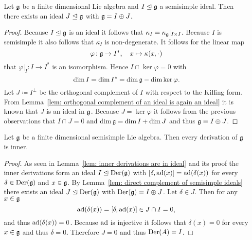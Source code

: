 \begin{lem}\label{lem: direct complement of semisimple ideals}
 Let $\mathfrak{g}$ be a finite dimensional Lie algebra and $I \trianglelefteq \mathfrak{g}$ a semisimple ideal. Then there exists an ideal $J \trianglelefteq \mathfrak{g}$ with $\mathfrak{g} = I \oplus J$.
\end{lem}
\begin{proof}
 Because $I \trianglelefteq \mathfrak{g}$ is an ideal it follows that $\kappa_I = \kappa_{\mathfrak{g}}|_{I \times I}$. Because $I$ is semisimple it also follows that $\kappa_I$ is non-degenerate. It follows for the linear map
 \[
  \varphi \colon \mathfrak{g} \to I^*, \quad x \mapsto \kappa(x, \cdot)
 \]
 that $\varphi|_I \colon I \to I^*$ is an isomorphism. Hence $I \cap \ker \varphi = 0$ with
 \[
  \dim I = \dim I^* = \dim \mathfrak{g} - \dim \ker \varphi.
 \]
 Let $J \coloneqq I^\perp$ be the orthogonal complement of $I$ with respect to the Killing form. From Lemma~\ref{lem: orthogonal complement of an ideal is again an ideal} it is known that $J$ is an ideal in $\mathfrak{g}$. Because $J = \ker \varphi$ it follows from the previous observations that $I \cap J = 0$ and $\dim \mathfrak{g} = \dim I + \dim J$ and thus $\mathfrak{g} = I \oplus J$.
\end{proof}


\begin{lem}\label{lem: every derivation of a semisimple Lie algebra is inner}
 Let $\mathfrak{g}$ be a finite dimensional semisimple Lie algebra. Then every derivation of $\mathfrak{g}$ is inner.
\end{lem}
\begin{proof}
 As seen in Lemma~\ref{lem: inner derivations are in ideal} and its proof the inner derivations form an ideal $I \trianglelefteq \operatorname{Der}(\mathfrak{g})$ with $[\delta,\operatorname{ad}(x)] = \operatorname{ad}(\delta(x))$ for every $\delta \in \operatorname{Der}(\mathfrak{g})$ and $x \in \mathfrak{g}$. By Lemma~\ref{lem: direct complement of semisimple ideals} there exists an ideal $J \trianglelefteq \operatorname{Der}(\mathfrak{g})$ with $\operatorname{Der}(\mathfrak{g}) = I \oplus J$. Let $\delta \in J$. Then for any $x \in \mathfrak{g}$
 \[
  \operatorname{ad}(\delta(x)) = [\delta, \operatorname{ad}(x)] \in J \cap I = 0,
 \]
 and thus $\operatorname{ad}(\delta(x)) = 0$. Because $\operatorname{ad}$ is injective it follows that $\delta(x) = 0$ for every $x \in \mathfrak{g}$ and thus $\delta = 0$. Therefore $J = 0$ and thus $\operatorname{Der}(A) = I$.
\end{proof}


